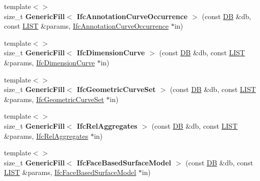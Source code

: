 \begin{DoxyCompactItemize}
\item 
\hypertarget{namespace_assimp_1_1_s_t_e_p_a8689bb5cdc3e343ca51365011ff4b99b}{{\footnotesize template$<$$>$ }\\size\+\_\+t {\bfseries Generic\+Fill$<$ Ifc\+Annotation\+Curve\+Occurrence $>$} (const \hyperlink{class_assimp_1_1_s_t_e_p_1_1_d_b}{D\+B} \&db, const \hyperlink{class_assimp_1_1_s_t_e_p_1_1_e_x_p_r_e_s_s_1_1_l_i_s_t}{L\+I\+S\+T} \&params, \hyperlink{struct_assimp_1_1_i_f_c_1_1_ifc_annotation_curve_occurrence}{Ifc\+Annotation\+Curve\+Occurrence} $\ast$in)}\label{namespace_assimp_1_1_s_t_e_p_a8689bb5cdc3e343ca51365011ff4b99b}

\item 
\hypertarget{namespace_assimp_1_1_s_t_e_p_af7e7ea045e3c2f9d721b6b8f8e4b9f46}{{\footnotesize template$<$$>$ }\\size\+\_\+t {\bfseries Generic\+Fill$<$ Ifc\+Dimension\+Curve $>$} (const \hyperlink{class_assimp_1_1_s_t_e_p_1_1_d_b}{D\+B} \&db, const \hyperlink{class_assimp_1_1_s_t_e_p_1_1_e_x_p_r_e_s_s_1_1_l_i_s_t}{L\+I\+S\+T} \&params, \hyperlink{struct_assimp_1_1_i_f_c_1_1_ifc_dimension_curve}{Ifc\+Dimension\+Curve} $\ast$in)}\label{namespace_assimp_1_1_s_t_e_p_af7e7ea045e3c2f9d721b6b8f8e4b9f46}

\item 
\hypertarget{namespace_assimp_1_1_s_t_e_p_af5fda1744435b87c853ded65fecc1df5}{{\footnotesize template$<$$>$ }\\size\+\_\+t {\bfseries Generic\+Fill$<$ Ifc\+Geometric\+Curve\+Set $>$} (const \hyperlink{class_assimp_1_1_s_t_e_p_1_1_d_b}{D\+B} \&db, const \hyperlink{class_assimp_1_1_s_t_e_p_1_1_e_x_p_r_e_s_s_1_1_l_i_s_t}{L\+I\+S\+T} \&params, \hyperlink{struct_assimp_1_1_i_f_c_1_1_ifc_geometric_curve_set}{Ifc\+Geometric\+Curve\+Set} $\ast$in)}\label{namespace_assimp_1_1_s_t_e_p_af5fda1744435b87c853ded65fecc1df5}

\item 
\hypertarget{namespace_assimp_1_1_s_t_e_p_a6fdff8f287415ac9ee71c4fc43d8ae79}{{\footnotesize template$<$$>$ }\\size\+\_\+t {\bfseries Generic\+Fill$<$ Ifc\+Rel\+Aggregates $>$} (const \hyperlink{class_assimp_1_1_s_t_e_p_1_1_d_b}{D\+B} \&db, const \hyperlink{class_assimp_1_1_s_t_e_p_1_1_e_x_p_r_e_s_s_1_1_l_i_s_t}{L\+I\+S\+T} \&params, \hyperlink{struct_assimp_1_1_i_f_c_1_1_ifc_rel_aggregates}{Ifc\+Rel\+Aggregates} $\ast$in)}\label{namespace_assimp_1_1_s_t_e_p_a6fdff8f287415ac9ee71c4fc43d8ae79}

\item 
\hypertarget{namespace_assimp_1_1_s_t_e_p_a9f002525953c2e0dd1ad4f7a347acbc8}{{\footnotesize template$<$$>$ }\\size\+\_\+t {\bfseries Generic\+Fill$<$ Ifc\+Face\+Based\+Surface\+Model $>$} (const \hyperlink{class_assimp_1_1_s_t_e_p_1_1_d_b}{D\+B} \&db, const \hyperlink{class_assimp_1_1_s_t_e_p_1_1_e_x_p_r_e_s_s_1_1_l_i_s_t}{L\+I\+S\+T} \&params, \hyperlink{struct_assimp_1_1_i_f_c_1_1_ifc_face_based_surface_model}{Ifc\+Face\+Based\+Surface\+Model} $\ast$in)}\label{namespace_assimp_1_1_s_t_e_p_a9f002525953c2e0dd1ad4f7a347acbc8}


\end{DoxyCompactItemize}
